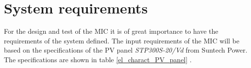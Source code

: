 \section{System requirements}

For the design and test of the MIC it is of great importance to have the requirements of the system defined. The input requirements of the MIC will be based on the specifications of the PV panel \textit{STP300S-20/Vd} from Suntech Power. The specifications are shown in table \ref{el_charact_PV_panel} .


